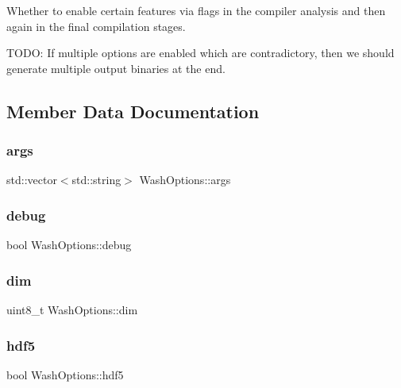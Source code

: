 Whether to enable certain features via flags in the compiler analysis and then again in the final compilation stages.

T\+O\+DO\+: If multiple options are enabled which are contradictory, then we should generate multiple output binaries at the end. 

\subsection{Member Data Documentation}
\mbox{\label{structWashOptions_abc32ad74441fbc82069b4addc130d4cd}} 
\subsubsection{\texorpdfstring{args}{args}}
{\footnotesize\ttfamily std\+::vector$<$std\+::string$>$ Wash\+Options\+::args}

\mbox{\label{structWashOptions_a5bc365ad8fc0544864d15709b6808843}} 
\subsubsection{\texorpdfstring{debug}{debug}}
{\footnotesize\ttfamily bool Wash\+Options\+::debug}

\mbox{\label{structWashOptions_a0caa33c545fc380c4104ca90f6462dfb}} 
\subsubsection{\texorpdfstring{dim}{dim}}
{\footnotesize\ttfamily uint8\+\_\+t Wash\+Options\+::dim}

\mbox{\label{structWashOptions_a31ed802896363b97ac1f5199a6940df9}} 
\subsubsection{\texorpdfstring{hdf5}{hdf5}}
{\footnotesize\ttfamily bool Wash\+Options\+::hdf5}

